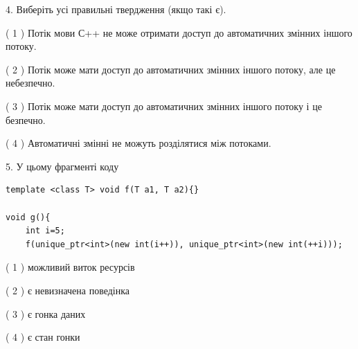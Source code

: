 \documentclass[12pt, ukrainian]{article}
\begin{document}
\begin {large}
{%
4. Виберіть усі правильні твердження (якщо такі є).\par
\vspace{2mm}

( 1 ) Потік мови С++ не може отримати доступ до автоматичних змінних іншого потоку.%

( 2 ) Потік може мати доступ до автоматичних змінних іншого потоку, але це небезпечно.%

( 3 ) Потік може мати доступ до автоматичних змінних іншого потоку і це безпечно.%

( 4 ) Автоматичні змінні не можуть розділятися між потоками.%


5. У цьому фрагменті коду
\begin{verbatim}
template <class T> void f(T a1, T a2){}

void g(){
    int i=5;
    f(unique_ptr<int>(new int(i++)), unique_ptr<int>(new int(++i)));
\end{verbatim}

( 1 ) можливий виток ресурсів%

( 2 ) є невизначена поведінка%

( 3 ) є гонка даних%

( 4 ) є стан гонки%
}
\end {large}
\end{document}
